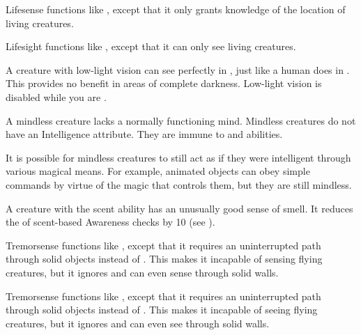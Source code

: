         Lifesense functions like , except that it only grants knowledge of the location of living creatures.

        Lifesight functions like , except that it can only see living creatures.

        A creature with low-light vision can see perfectly in , just like a human does in .
        This provides no benefit in areas of complete darkness.
        Low-light vision is disabled while you are \dazzled.

        A mindless creature lacks a normally functioning mind.
        Mindless creatures do not have an Intelligence attribute.
        They are immune to  and  abilities.

        It is possible for mindless creatures to still act as if they were intelligent through various magical means.
        For example, animated objects can obey simple commands by virtue of the magic that controls them, but they are still mindless.

        A creature with the scent ability has an unusually good sense of smell.
        It reduces the  of scent-based Awareness checks by 10 (see ).

        Tremorsense functions like , except that it requires an uninterrupted path through solid objects instead of .
        This makes it incapable of sensing flying creatures, but it ignores  and can even sense through solid walls.

        Tremorsense functions like , except that it requires an uninterrupted path through solid objects instead of .
        This makes it incapable of seeing flying creatures, but it ignores  and can even see through solid walls.
